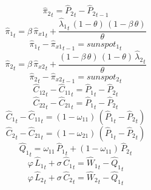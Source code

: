 \begin{dmath}
{{\hat{\pi}_{2}}}_{t}={{\hat{P}_{2}}}_{t}-{{\hat{P}_{2}}}_{t-1}
\end{dmath}
\begin{dmath}
{{\hat{\pi}_{1}}}_{t}={{\beta}}\, {{\hat{\pi}_{x1}}}_{t}+\frac{{{\hat{\lambda}_{1}}}_{t}\, \left(1-{{\theta}}\right)\, \left(1-{{\beta}}\, {{\theta}}\right)}{{{\theta}}}
\end{dmath}
\begin{dmath}
{{\hat{\pi}_{1}}}_{t}-{{\hat{\pi}_{x1}}}_{t-1}={{sunspot_{1}}}_{t}
\end{dmath}
\begin{dmath}
{{\hat{\pi}_{2}}}_{t}={{\beta}}\, {{\hat{\pi}_{x2}}}_{t}+\frac{\left(1-{{\beta}}\, {{\theta}}\right)\, \left(1-{{\theta}}\right)\, {{\hat{\lambda}_{2}}}_{t}}{{{\theta}}}
\end{dmath}
\begin{dmath}
{{\hat{\pi}_{2}}}_{t}-{{\hat{\pi}_{x2}}}_{t-1}={{sunspot_{2}}}_{t}
\end{dmath}
\begin{dmath}
{{\hat{C}_{12}}}_{t}-{{\hat{C}_{11}}}_{t}={{\hat{P}_{1}}}_{t}-{{\hat{P}_{2}}}_{t}
\end{dmath}
\begin{dmath}
{{\hat{C}_{22}}}_{t}-{{\hat{C}_{21}}}_{t}={{\hat{P}_{1}}}_{t}-{{\hat{P}_{2}}}_{t}
\end{dmath}
\begin{dmath}
{{\hat{C}_{1}}}_{t}-{{\hat{C}_{11}}}_{t}=\left(1-{{\omega_{11}}}\right)\, \left({{\hat{P}_{1}}}_{t}-{{\hat{P}_{2}}}_{t}\right)
\end{dmath}
\begin{dmath}
{{\hat{C}_{2}}}_{t}-{{\hat{C}_{21}}}_{t}=\left(1-{{\omega_{21}}}\right)\, \left({{\hat{P}_{1}}}_{t}-{{\hat{P}_{2}}}_{t}\right)
\end{dmath}
\begin{dmath}
{{\hat{Q}_{1}}}_{t}={{\omega_{11}}}\, {{\hat{P}_{1}}}_{t}+\left(1-{{\omega_{11}}}\right)\, {{\hat{P}_{2}}}_{t}
\end{dmath}
\begin{dmath}
{{\varphi}}\, {{\hat{L}_{1}}}_{t}+{{\sigma}}\, {{\hat{C}_{1}}}_{t}={{\hat{W}_{1}}}_{t}-{{\hat{Q}_{1}}}_{t}
\end{dmath}
\begin{dmath}
{{\varphi}}\, {{\hat{L}_{2}}}_{t}+{{\sigma}}\, {{\hat{C}_{2}}}_{t}={{\hat{W}_{2}}}_{t}-{{\hat{Q}_{1}}}_{t}
\end{dmath}
